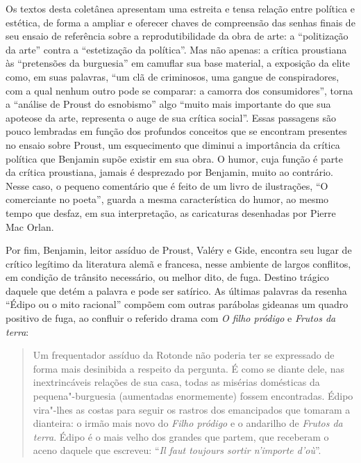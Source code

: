 Os textos desta coletânea apresentam uma estreita e tensa relação entre
política e estética, de forma a ampliar e oferecer chaves de compreensão
das senhas finais de seu ensaio de referência sobre a reprodutibilidade
da obra de arte: a ``politização da arte'' contra a ``estetização da
política''. Mas não apenas: a crítica proustiana às ``pretensões da
burguesia'' em camuflar sua base material, a exposição da elite como, em
suas palavras, ``um clã de criminosos, uma gangue de conspiradores, com
a qual nenhum outro pode se comparar: a camorra dos consumidores'',
torna a ``análise de Proust do esnobismo'' algo ``muito mais importante
do que sua apoteose da arte, representa o auge de sua crítica social''.
Essas passagens são pouco lembradas em função dos profundos conceitos
que se encontram presentes no ensaio sobre Proust, um esquecimento que
diminui a importância da crítica política que Benjamin supõe existir em
sua obra. O humor, cuja função é parte da crítica proustiana, jamais é
desprezado por Benjamin, muito ao contrário. Nesse caso, o pequeno
comentário que é feito de um livro de ilustrações, ``O comerciante no
poeta'', guarda a mesma característica do humor, ao mesmo tempo que
desfaz, em sua interpretação, as caricaturas desenhadas por Pierre Mac
Orlan.

Por fim, Benjamin, leitor assíduo de Proust, Valéry e Gide, encontra seu
lugar de crítico legítimo da literatura alemã e francesa, nesse ambiente
de largos conflitos, em condição de trânsito necessário, ou melhor dito,
de fuga. Destino trágico daquele que detém a palavra e pode ser
satírico. As últimas palavras da resenha ``Édipo ou o mito racional''
compõem com outras parábolas gideanas um quadro positivo de fuga, ao
confluir o referido drama com \emph{O filho pródigo} e \emph{Frutos da
terra}:

\begin{quote}
Um frequentador
assíduo da Rotonde não
poderia ter se expressado de forma mais desinibida a respeito da
pergunta. É como se diante dele, nas inextrincáveis relações de sua
casa, todas as misérias domésticas da pequena"-burguesia (aumentadas
enormemente) fossem encontradas. Édipo vira"-lhes as costas para seguir
os rastros dos emancipados que tomaram a dianteira: o irmão mais novo do
\emph{Filho pródigo} e o andarilho de \emph{Frutos da terra}. Édipo é o
mais velho dos grandes que partem, que receberam o aceno daquele que
escreveu: ``\emph{Il faut toujours sortir n'importe d'où}''.
\end{quote}

\asterisc

